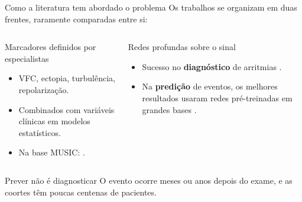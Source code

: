 \documentclass[10pt,aspectratio=169]{beamer}
\begin{document}
\begin{frame}{Como a literatura tem abordado o problema}
  Os trabalhos se organizam em duas frentes, raramente comparadas entre si:
  \vspace{0.3em}
  \begin{columns}[T]
    \begin{block}{Marcadores definidos por especialistas}
      \begin{itemize}
        \item VFC, ectopia, turbulência, repolarização.
        \item Combinados com variáveis clínicas em modelos estatísticos.
        \item Na base MUSIC: \cite{ramirez2017sudden, swee2026multimodal}.
      \end{itemize}
    \end{block}
    \begin{block}{Redes profundas sobre o sinal}
      \begin{itemize}
        \item Sucesso no \textbf{diagnóstico} de arritmias
          \cite{hannun2019cardiologist, ribeiro2020automatic}.
        \item Na \textbf{predição} de eventos, os melhores resultados usaram
          redes pré-treinadas em grandes bases \cite{kim2025deep}.
      \end{itemize}
    \end{block}
  \end{columns}
  \vspace{0.5em}
  \begin{block}{Prever não é diagnosticar}
    O evento ocorre meses ou anos depois do exame, e as coortes têm poucas
    centenas de pacientes.
  \end{block}
\end{frame}
\end{document}
